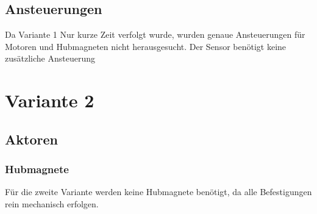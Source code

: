 \subsection{Ansteuerungen}
Da Variante 1 Nur kurze Zeit verfolgt wurde, wurden genaue Ansteuerungen für Motoren und Hubmagneten nicht herausgesucht. Der Sensor benötigt keine zusätzliche Ansteuerung

\section{Variante 2}
\subsection{Aktoren}
\subsubsection{Hubmagnete}
Für die zweite Variante werden keine Hubmagnete benötigt, da alle Befestigungen rein mechanisch erfolgen.

